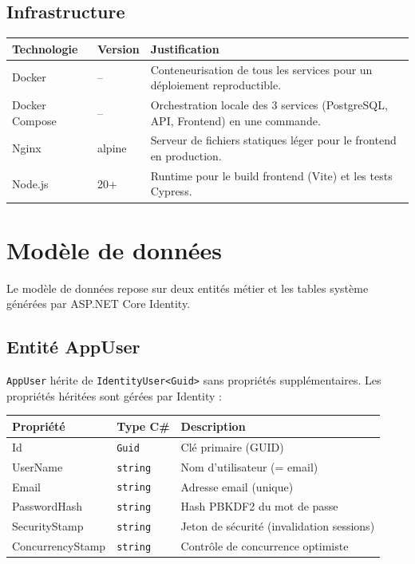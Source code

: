 \documentclass[12pt,a4paper]{article}
\begin{document}
\subsection{Infrastructure}

\begin{longtable}{p{5.5cm} p{2cm} p{7cm}}
\toprule
\textbf{Technologie} & \textbf{Version} & \textbf{Justification} \\
\midrule
\endhead
Docker & -- & Conteneurisation de tous les services pour un d\'eploiement reproductible. \\
Docker Compose & -- & Orchestration locale des 3 services (PostgreSQL, API, Frontend) en une commande. \\
Nginx & alpine & Serveur de fichiers statiques l\'eger pour le frontend en production. \\
Node.js & 20+ & Runtime pour le build frontend (Vite) et les tests Cypress. \\
\bottomrule
\end{longtable}

\section{Mod\`ele de donn\'ees}

Le mod\`ele de donn\'ees repose sur deux entit\'es m\'etier et les tables syst\`eme g\'en\'er\'ees par ASP.NET Core Identity.

\subsection{Entit\'e AppUser}

\texttt{AppUser} h\'erite de \texttt{IdentityUser<Guid>} sans propri\'et\'es suppl\'ementaires. Les propri\'et\'es h\'erit\'ees sont g\'er\'ees par Identity :

\begin{longtable}{p{4.5cm} p{3.5cm} p{6.5cm}}
\toprule
\textbf{Propri\'et\'e} & \textbf{Type C\#} & \textbf{Description} \\
\midrule
\endhead
Id & \texttt{Guid} & Cl\'e primaire (GUID) \\
UserName & \texttt{string} & Nom d'utilisateur (= email) \\
Email & \texttt{string} & Adresse email (unique) \\
PasswordHash & \texttt{string} & Hash PBKDF2 du mot de passe \\
SecurityStamp & \texttt{string} & Jeton de s\'ecurit\'e (invalidation sessions) \\
ConcurrencyStamp & \texttt{string} & Contr\^ole de concurrence optimiste \\
\bottomrule
\end{longtable}
\end{document}

